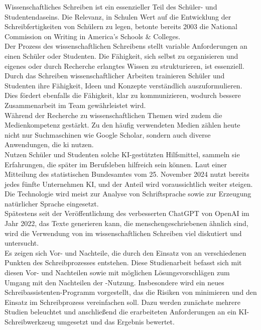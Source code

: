 \documentclass[../main.tex]{subfiles}
\begin{document}
Wissenschaftliches Schreiben ist ein essenzieller Teil des Schüler- und Studentendaseins. Die Relevanz, in Schulen Wert auf die Entwicklung der Schreibfertigkeiten von Schülern zu legen, 
betonte bereits 2003 die National Commission on Writing in America’s Schools \& Colleges\cite{nationalcommissionwriting}. \\ Der Prozess des wissenschaftlichen Schreibens stellt variable 
Anforderungen an einen Schüler oder Studenten. Die Fähigkeit, sich selbst zu organisieren und eigenes oder durch Recherche erlangtes Wissen zu strukturieren, ist essenziell. Durch das 
Schreiben wissenschaftlicher Arbeiten trainieren Schüler und Studenten ihre Fähigkeit, Ideen und Konzepte verständlich auszuformulieren. Dies fördert ebenfalls die Fähigkeit, klar zu 
kommunizieren, wodurch bessere Zusammenarbeit im Team gewährleistet wird.\cite{nationalcommissionwriting,teachers,humanWritingToAi} \\ 
Während der Recherche zu wissenschaftlichen Themen wird zudem die Medienkompetenz gestärkt. Zu den häufig verwendeten Medien zählen heute nicht nur Suchmaschinen wie Google Scholar, sondern 
auch diverse Anwendungen, die \gls{ki} nutzen.\\ Nutzen Schüler und Studenten solche KI-gestützten Hilfsmittel, sammeln sie Erfahrungen, die später im Berufsleben hilfreich sein können. Laut 
einer Mitteilung des statistischen Bundesamtes vom 25. November 2024 nutzt bereits jedes fünfte Unternehmen KI, und der Anteil wird voraussichtlich weiter steigen\cite{statistischesBundesamt}. 
Die Technologie wird meist zur Analyse von Schriftsprache sowie zur Erzeugung natürlicher Sprache eingesetzt\cite{statistischesBundesamt}.\\ 
Spätestens seit der Veröffentlichung des verbesserten ChatGPT von OpenAI im Jahr 2022, das Texte generieren kann, die menschengeschriebenen ähnlich sind, wird die Verwendung von 
 im wissenschaftlichen Schreiben viel diskutiert und untersucht.\cite{humanWritingToAi,ZukunftWissenschaftlichesPublizieren}\\
Es zeigen sich Vor- und Nachteile, die durch den Einsatz von  an verschiedenen Punkten des Schreibprozesses entstehen. Diese Studienarbeit befasst sich mit diesen 
Vor- und Nachteilen sowie mit möglichen Lösungsvorschlägen zum Umgang mit den Nachteilen der -Nutzung. Insbesondere wird ein neues Schreibassistenten-Programm vorgestellt, das 
die Risiken von  minimieren und den Einsatz im Schreibprozess vereinfachen soll. Dazu werden zunächste mehrere Studien beleuchtet und anschließend die erarbeiteten Anforderungen an ein KI-Schreibwerkzeug
umgesetzt und das Ergebnis bewertet.
\end{document}
